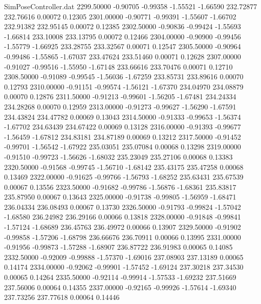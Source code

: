 \begin{filecontents}{SimPoseController.dat}
2299.50000   -0.90705   -0.99358    -1.55521   -1.66590  232.72877  232.76616    0.00072    0.12305
2301.00000   -0.90771   -0.99391    -1.55607   -1.66702  232.91382  232.95145    0.00072    0.12385
2302.50000   -0.90836   -0.99424    -1.55693   -1.66814  233.10008  233.13795    0.00072    0.12466
2304.00000   -0.90900   -0.99456    -1.55779   -1.66925  233.28755  233.32567    0.00071    0.12547
2305.50000   -0.90964   -0.99486    -1.55865   -1.67037  233.47624  233.51460    0.00071    0.12628
2307.00000   -0.91027   -0.99516    -1.55950   -1.67148  233.66616  233.70476    0.00071    0.12710
2308.50000   -0.91089   -0.99545    -1.56036   -1.67259  233.85731  233.89616    0.00070    0.12793
2310.00000   -0.91151   -0.99574    -1.56121   -1.67370  234.04970  234.08879    0.00070    0.12876
2311.50000   -0.91213   -0.99601    -1.56205   -1.67481  234.24334  234.28268    0.00070    0.12959
2313.00000   -0.91273   -0.99627    -1.56290   -1.67591  234.43824  234.47782    0.00069    0.13043
2314.50000   -0.91333   -0.99653    -1.56374   -1.67702  234.63439  234.67422    0.00069    0.13128
2316.00000   -0.91393   -0.99677    -1.56459   -1.67812  234.83181  234.87189    0.00069    0.13212
2317.50000   -0.91452   -0.99701    -1.56542   -1.67922  235.03051  235.07084    0.00068    0.13298
2319.00000   -0.91510   -0.99723    -1.56626   -1.68032  235.23049  235.27106    0.00068    0.13383
2320.50000   -0.91568   -0.99745    -1.56710   -1.68142  235.43175  235.47258    0.00068    0.13469
2322.00000   -0.91625   -0.99766    -1.56793   -1.68252  235.63431  235.67539    0.00067    0.13556
2323.50000   -0.91682   -0.99786    -1.56876   -1.68361  235.83817  235.87950    0.00067    0.13643
2325.00000   -0.91738   -0.99805    -1.56959   -1.68471  236.04334  236.08493    0.00067    0.13730
2326.50000   -0.91793   -0.99824    -1.57042   -1.68580  236.24982  236.29166    0.00066    0.13818
2328.00000   -0.91848   -0.99841    -1.57124   -1.68689  236.45763  236.49972    0.00066    0.13907
2329.50000   -0.91902   -0.99858    -1.57206   -1.68798  236.66676  236.70911    0.00066    0.13995
2331.00000   -0.91956   -0.99873    -1.57288   -1.68907  236.87722  236.91983    0.00065    0.14085
2332.50000   -0.92009   -0.99888    -1.57370   -1.69016  237.08903  237.13189    0.00065    0.14174
2334.00000   -0.92062   -0.99901    -1.57452   -1.69124  237.30218  237.34530    0.00065    0.14264
2335.50000   -0.92114   -0.99914    -1.57533   -1.69232  237.51669  237.56006    0.00064    0.14355
2337.00000   -0.92165   -0.99926    -1.57614   -1.69340  237.73256  237.77618    0.00064    0.14446

\end{filecontents}
